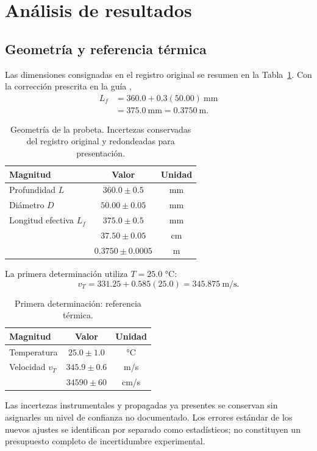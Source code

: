 \section{Análisis de resultados}

\subsection{Geometría y referencia térmica}
Las dimensiones consignadas en el registro original se resumen en la Tabla~\ref{tab:geo}. Con la corrección prescrita en la guía \cite{guiauca},
\begin{equation}
\begin{aligned}
L_f&=360.0+0.3(50.00)\ \mathrm{mm}\\
   &=375.0\ \mathrm{mm}=0.3750\ \mathrm{m}.
\end{aligned}
\label{eq:lf_numerica}
\end{equation}
\begin{table}[!t]
\centering
\caption{Geometría de la probeta. Incertezas conservadas del registro original y redondeadas para presentación.}
\label{tab:geo}
\begin{tabular}{lcc}
\toprule
Magnitud & Valor & Unidad\\
\midrule
Profundidad $L$ & $360.0\pm0.5$ & mm\\
Diámetro $D$ & $50.00\pm0.05$ & mm\\
Longitud efectiva $L_f$ & $375.0\pm0.5$ & mm\\
 & $37.50\pm0.05$ & cm\\
 & $0.3750\pm0.0005$ & m\\
\bottomrule
\end{tabular}
\end{table}
La primera determinación utiliza $T=25.0$ \si{\degreeCelsius}:
\begin{equation}
v_T=331.25+0.585(25.0)=345.875\ \mathrm{m/s}.
\label{eq:vt_numerica}
\end{equation}
\begin{table}[!t]
\centering
\caption{Primera determinación: referencia térmica.}
\label{tab:velocidad_temp}
\begin{tabular}{lcc}
\toprule
Magnitud & Valor & Unidad\\
\midrule
Temperatura & $25.0\pm1.0$ & \si{\degreeCelsius}\\
Velocidad $v_T$ & $345.9\pm0.6$ & m/s\\
 & $34590\pm60$ & cm/s\\
\bottomrule
\end{tabular}
\end{table}
Las incertezas instrumentales y propagadas ya presentes se conservan sin asignarles un nivel de confianza no documentado. Los errores estándar de los nuevos ajustes se identifican por separado como estadísticos; no constituyen un presupuesto completo de incertidumbre experimental.

